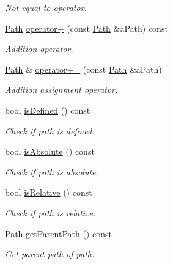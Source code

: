 \begin{DoxyCompactItemize}
\begin{DoxyCompactList}\small\item\em Not equal to operator. \end{DoxyCompactList}\item 
\mbox{\hyperlink{classlibrary_1_1core_1_1fs_1_1_path}{Path}} \mbox{\hyperlink{classlibrary_1_1core_1_1fs_1_1_path_a3f86a7054939a51f44b2f5a796470071}{operator+}} (const \mbox{\hyperlink{classlibrary_1_1core_1_1fs_1_1_path}{Path}} \&a\+Path) const
\begin{DoxyCompactList}\small\item\em Addition operator. \end{DoxyCompactList}\item 
\mbox{\hyperlink{classlibrary_1_1core_1_1fs_1_1_path}{Path}} \& \mbox{\hyperlink{classlibrary_1_1core_1_1fs_1_1_path_a79ce7b2d9ac53e3bb22240f8cd5c883a}{operator+=}} (const \mbox{\hyperlink{classlibrary_1_1core_1_1fs_1_1_path}{Path}} \&a\+Path)
\begin{DoxyCompactList}\small\item\em Addition assignment operator. \end{DoxyCompactList}\item 
bool \mbox{\hyperlink{classlibrary_1_1core_1_1fs_1_1_path_a4315cfd12f61bf477e010f33122c3d0c}{is\+Defined}} () const
\begin{DoxyCompactList}\small\item\em Check if path is defined. \end{DoxyCompactList}\item 
bool \mbox{\hyperlink{classlibrary_1_1core_1_1fs_1_1_path_a9a5772dfc1273a74137ca301e9a84d61}{is\+Absolute}} () const
\begin{DoxyCompactList}\small\item\em Check if path is absolute. \end{DoxyCompactList}\item 
bool \mbox{\hyperlink{classlibrary_1_1core_1_1fs_1_1_path_a97cf61b699efe17e23ac3a91daf897e2}{is\+Relative}} () const
\begin{DoxyCompactList}\small\item\em Check if path is relative. \end{DoxyCompactList}\item 
\mbox{\hyperlink{classlibrary_1_1core_1_1fs_1_1_path}{Path}} \mbox{\hyperlink{classlibrary_1_1core_1_1fs_1_1_path_a0cdc72946505290b9fc2022618f118d9}{get\+Parent\+Path}} () const
\begin{DoxyCompactList}\small\item\em Get parent path of path. \end{DoxyCompactList}\item 

\end{DoxyCompactItemize}
